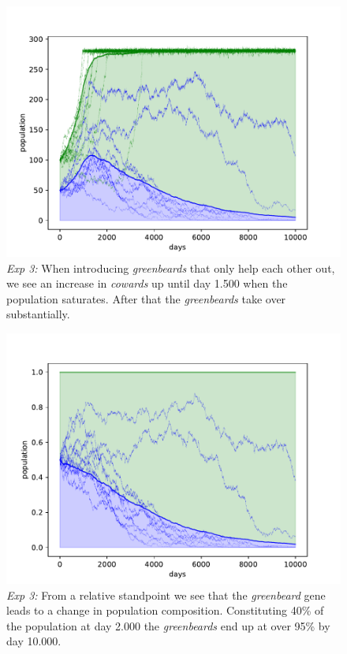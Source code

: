 \documentclass[sigconf]{acmart}
\newcommand{\cowards}{\textit{cowards}\xspace}
\newcommand{\greenbeards}{\textit{greenbeards}\xspace}
\newcommand{\greenbeard}{\textit{greenbeard}\xspace}
\begin{document}
    \begin{figure}[t]
        \includegraphics[width=\columnwidth]{figures/exp3_greenbeard}
        \caption{\textit{Exp 3:} When introducing \greenbeards that only help each other out, we see an increase in \cowards up until day 1.500 when the population saturates.
        After that the \greenbeards take over substantially.}
        \label{fig:exp3_greenbeard}
    \end{figure}


    \begin{figure}[t]
        \includegraphics[width=\columnwidth]{figures/exp3_greenbeard_rel}
        \caption{\textit{Exp 3:} From a relative standpoint we see that the \greenbeard gene leads to a change in population composition.
        Constituting 40\% of the population at day 2.000 the \greenbeards end up at over 95\% by day 10.000.}
        \label{fig:exp3_greenbeard_rel}
    \end{figure}
\end{document}
